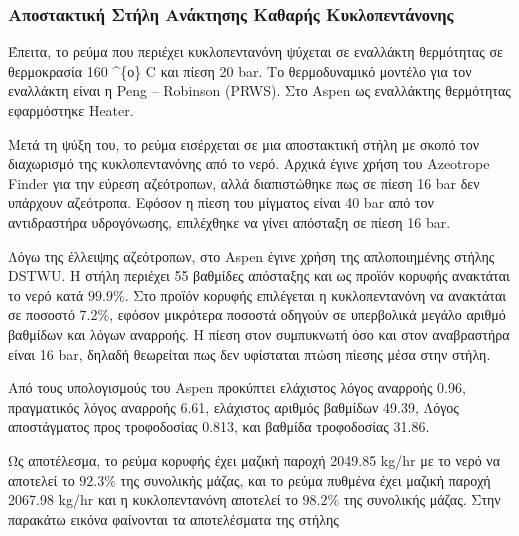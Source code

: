 \documentclass[11pt]{article}
\begin{document}
\subsubsection{Αποστακτική Στήλη Ανάκτησης Καθαρής Κυκλοπεντάνονης}
\label{sec:orgb895cf7}
Έπειτα, το ρεύμα που περιέχει κυκλοπεντανόνη ψύχεται σε εναλλάκτη
θερμότητας σε θερμοκρασία 160 \^{}\{ο\} C και πίεση 20 bar. Το θερμοδυναμικό
μοντέλο για τον εναλλάκτη είναι η Peng -- Robinson (PRWS). Στο Aspen ως
εναλλάκτης θερμότητας εφαρμόστηκε Heater.

Μετά τη ψύξη του, το ρεύμα εισέρχεται σε μια αποστακτική στήλη με σκοπό
τον διαχωρισμό της κυκλοπεντανόνης από το νερό. Αρχικά έγινε χρήση του
Azeotrope Finder για την εύρεση αζεότροπων, αλλά διαπιστώθηκε πως σε
πίεση 16 bar δεν υπάρχουν αζεότροπα. Εφόσον η πίεση του μίγματος είναι
40 bar από τον αντιδραστήρα υδρογόνωσης, επιλέχθηκε να γίνει απόσταξη σε
πίεση 16 bar.

Λόγω της έλλειψης αζεότροπων, στο Aspen έγινε χρήση της απλοποιημένης
στήλης DSTWU. Η στήλη περιέχει 55 βαθμίδες απόσταξης και ως προϊόν
κορυφής ανακτάται το νερό κατά \(99.9 \%\). Στο προϊόν κορυφής επιλέγεται η
κυκλοπεντανόνη να ανακτάται σε ποσοστό \(7.2 \%\), εφόσον μικρότερα ποσοστά
οδηγούν σε υπερβολικά μεγάλο αριθμό βαθμίδων και λόγων αναρροής. Η πίεση
στον συμπυκνωτή όσο και στον αναβραστήρα είναι 16 bar, δηλαδή θεωρείται
πως δεν υφίσταται πτώση πίεσης μέσα στην στήλη.

Από τους υπολογισμούς του Aspen προκύπτει ελάχιστος λόγος αναρροής 0.96,
πραγματικός λόγος αναρροής 6.61, ελάχιστος αριθμός βαθμίδων 49.39, Λόγος
αποστάγματος προς τροφοδοσίας 0.813, και βαθμίδα τροφοδοσίας 31.86.

Ως αποτέλεσμα, το ρεύμα κορυφής έχει μαζική παροχή 2049.85 kg/hr με το
νερό να αποτελεί το \(92.3 \%\) της συνολικής μάζας, και το ρεύμα πυθμένα έχει
μαζική παροχή 2067.98 kg/hr και η κυκλοπεντανόνη αποτελεί το \(98.2 \%\) της
συνολικής μάζας. Στην παρακάτω εικόνα φαίνονται τα αποτελέσματα της
στήλης
\end{document}
